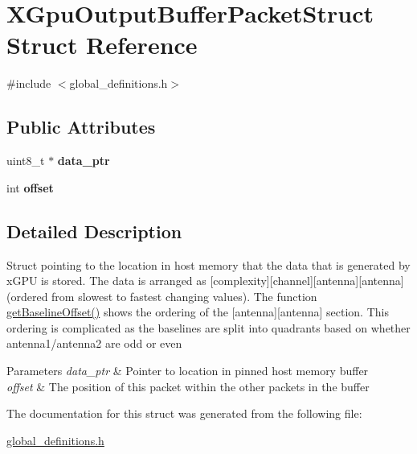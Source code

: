 \hypertarget{struct_x_gpu_output_buffer_packet_struct}{}\section{X\+Gpu\+Output\+Buffer\+Packet\+Struct Struct Reference}
\label{struct_x_gpu_output_buffer_packet_struct}


{\ttfamily \#include $<$global\+\_\+definitions.\+h$>$}

\subsection*{Public Attributes}
\begin{DoxyCompactItemize}
\item 
uint8\+\_\+t $\ast$ {\bfseries data\+\_\+ptr}\hypertarget{struct_x_gpu_output_buffer_packet_struct_a5ad7f78136003f75e1390231c4e80a72}{}\label{struct_x_gpu_output_buffer_packet_struct_a5ad7f78136003f75e1390231c4e80a72}

\item 
int {\bfseries offset}\hypertarget{struct_x_gpu_output_buffer_packet_struct_a01434260e0b53d020d72bd50e8163873}{}\label{struct_x_gpu_output_buffer_packet_struct_a01434260e0b53d020d72bd50e8163873}

\end{DoxyCompactItemize}


\subsection{Detailed Description}
Struct pointing to the location in host memory that the data that is generated by x\+G\+PU is stored. The data is arranged as \mbox{[}complexity\mbox{]}\mbox{[}channel\mbox{]}\mbox{[}antenna\mbox{]}\mbox{[}antenna\mbox{]}(ordered from slowest to fastest changing values). The function \hyperlink{global__definitions_8h_a715d2499260b59d9c8d45517fd543d15}{get\+Baseline\+Offset()} shows the ordering of the \mbox{[}antenna\mbox{]}\mbox{[}antenna\mbox{]} section. This ordering is complicated as the baselines are split into quadrants based on whether antenna1/antenna2 are odd or even 
\begin{DoxyParams}{Parameters}
{\em data\+\_\+ptr} & Pointer to location in pinned host memory buffer \\
\hline
{\em offset} & The position of this packet within the other packets in the buffer \\
\hline
\end{DoxyParams}


The documentation for this struct was generated from the following file\+:\begin{DoxyCompactItemize}
\item 
\hyperlink{global__definitions_8h}{global\+\_\+definitions.\+h}\end{DoxyCompactItemize}
